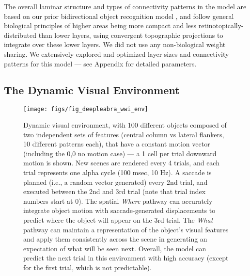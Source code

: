 \documentclass[11pt,twoside]{article}
\newif\myifpdf
\begin{document}
The overall laminar structure and types of connectivity patterns in the model are based on our prior bidirectional object recognition model \cite{OReillyWyatteHerdEtAl13}, and follow general biological principles of higher areas being more compact and less retinotopically-distributed than lower layers, using convergent topographic projections to integrate over these lower layers. We did not use any non-biological weight sharing.  We extensively explored and optimized layer sizes and connectivity patterns for this model --- see Appendix for detailed parameters.

\subsection{The Dynamic Visual Environment}

\begin{figure}
  \centering\texttt{[image: figs/fig\_deepleabra\_wwi\_env]}
  \caption{\footnotesize Dynamic visual environment, with 100 different objects composed of two independent sets of features (central column vs lateral flankers, 10 different patterns each), that have a constant motion vector (including the 0,0 no motion case) --- a 1 cell per trial downward motion is shown.  New scenes are rendered every 4 trials, and each trial represents one alpha cycle (100 msec, 10 Hz). A saccade is planned (i.e., a random vector generated) every 2nd trial, and executed between the 2nd and 3rd trial (note that trial index numbers start at 0).  The spatial {\em Where} pathway can accurately integrate object motion with saccade-generated displacements to predict where the object will appear on the 3rd trial.  The {\em What} pathway can maintain a representation of the object's visual features and apply them consistently across the scene in generating an expectation of what will be seen next.  Overall, the model can predict the next trial in this environment with high accuracy (except for the first trial, which is not predictable).}
  \label{fig.wwi_env}
\end{figure}

\end{document}
